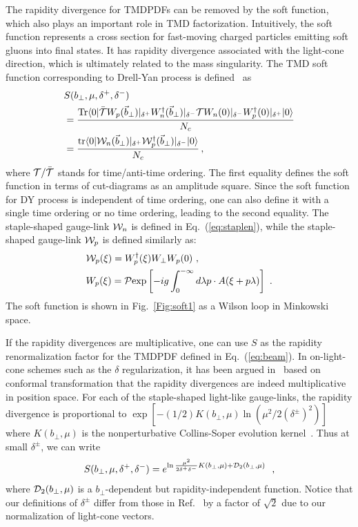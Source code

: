 \documentclass[aps,rmp,reprint,amsmath,amssymb,graphicx,longbibliography]{revtex4-1} %
\DeclareRobustCommand{\eq}[1]{Eq.~(\ref{eq:#1})}
\begin{document}
The rapidity divergence for TMDPDFs can be removed by the
soft function, which also plays an important role in TMD factorization.
Intuitively, the soft function represents a cross section for fast-moving
charged particles emitting soft gluons into final states. It has rapidity divergence associated with the light-cone direction, which
is ultimately related to the mass singularity. The TMD soft function corresponding to Drell-Yan process is defined~\cite{Collins:2011ca,Echevarria:2015byo} as
\begin{align}\label{eq:soft}
	& S(b_\perp,\mu,\delta^+,\delta^-)\nonumber \\
	&=\frac{{\rm Tr}\langle 0|{\cal \bar T}W_p(\vec{b}_\perp)|_{\delta^+}W_n^{\dagger}(\vec{b}_\perp)|_{\delta^-}{\cal T} W_n(0)|_{\delta^-}W^{\dagger}_p(0)|_{\delta^+}|0\rangle }{N_c} \nonumber \\
	&=\frac{{\rm tr}\langle 0|{\cal W}_{n}(\vec{b}_\perp)|_{\delta^+} {\cal W}^{\dagger}_{p}(\vec{b}_\perp)|_{\delta^-}|0\rangle}{N_c} \,,
\end{align}
where ${\cal T}/\bar{\cal T}$ stands for time/anti-time ordering. The first equality defines the soft function in terms of cut-diagrams as an amplitude square. Since the soft function for DY process is independent of time ordering, one can also define it with a single time ordering or no time ordering, leading to the second equality. The staple-shaped gauge-link ${\cal W}_n$ is defined in Eq.~(\ref{eq:staplen}),
while the staple-shaped gauge-link ${\cal W}_p$ is defined similarly as:
\begin{align}
	&{\cal W}_p(\xi)=W^{\dagger}_{p}(\xi)W_{\perp}W_{p}(0) \label{eq:staplep} \ , \\
	&W_{p}(\xi)= {\cal P}{\rm exp}\left[-ig\int_{0}^{-\infty} d\lambda p\cdot A(\xi+p \lambda)\right] \ .
\end{align}
The soft function is shown in Fig.~\ref{Fig:soft1} as a Wilson loop in Minkowski space.

If the rapidity divergences are multiplicative, one can use $S$ as the rapidity renormalization factor for the TMDPDF defined in \eq{beam}. In on-light-cone schemes such as the $\delta$ regularization, it has been argued in~\cite{Vladimirov:2017ksc} based on conformal transformation that the rapidity divergences are indeed multiplicative in position space. For each of the staple-shaped light-like gauge-links, the rapidity divergence is proportional to $\exp\left[-(1/2)K(b_\perp,\mu)\ln \left(\mu^2/2(\delta^{\pm})^2\right)\right]$ where $K(b_\perp,\mu)$ is the nonperturbative Collins-Soper evolution kernel~\cite{Collins:1981uk}. Thus at small $\delta^{\pm}$, we can write
\begin{equation}
	S(b_\perp,\mu,\delta^+,\delta^-)=e^{\ln \frac{\mu^2}{2\delta^+\delta^-}K(b_\perp,\mu)+{\cal D}_2(b_\perp,\mu)} \ \ ,
\end{equation}
where ${\cal D}_2(b_\perp,\mu)$ is a $b_\perp$-dependent but rapidity-independent function. Notice that our definitions of $\delta^{\pm}$ differ from those in Ref.~\cite{Echevarria:2015byo} by a factor of $\sqrt{2}$ due to our normalization of light-cone vectors.
\end{document}
